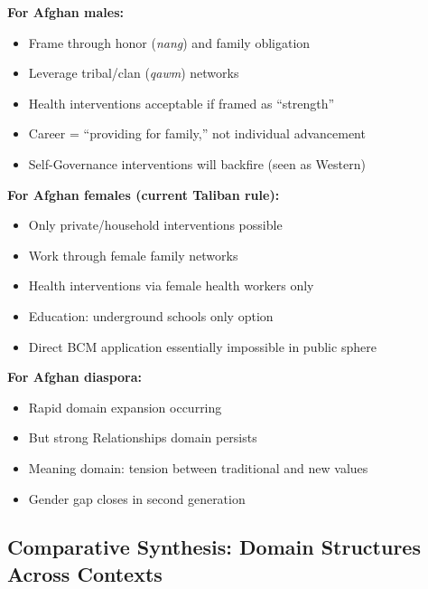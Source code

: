 \begin{tcolorbox}[colback=blue!5!white, colframe=blue!75!black, title=Practitioner Guidance: Afghan Context]

\textbf{For Afghan males:}
\begin{itemize}[nosep]
\item Frame through honor (\textit{nang}) and family obligation
\item Leverage tribal/clan (\textit{qawm}) networks
\item Health interventions acceptable if framed as ``strength''
\item Career = ``providing for family,'' not individual advancement
\item Self-Governance interventions will backfire (seen as Western)
\end{itemize}

\textbf{For Afghan females (current Taliban rule):}
\begin{itemize}[nosep]
\item Only private/household interventions possible
\item Work through female family networks
\item Health interventions via female health workers only
\item Education: underground schools only option
\item Direct BCM application essentially impossible in public sphere
\end{itemize}

\textbf{For Afghan diaspora:}
\begin{itemize}[nosep]
\item Rapid domain expansion occurring
\item But strong Relationships domain persists
\item Meaning domain: tension between traditional and new values
\item Gender gap closes in second generation
\end{itemize}

\end{tcolorbox}


\subsection{Comparative Synthesis: Domain Structures Across Contexts}
\label{sec:bj-synthesis}


